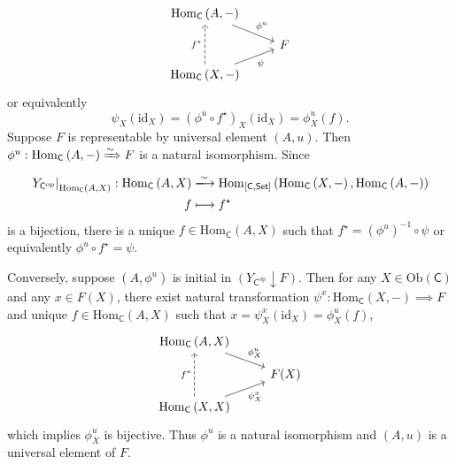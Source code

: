 {\[\begin{tikzcd}[ampersand replacement=\&, row sep=9pt]
               \mathrm{Hom}_{\mathsf{C}}\left(A,-\right) \arrow[rd, "\phi^u"]\&\\
            \& F\\
             \mathrm{Hom}_{\mathsf{C}}\left(X,-\right) \arrow[ru, "\psi"']\arrow[uu, dashed, "f^\star"]\& 
            \end{tikzcd}
    \]
    or equivalently
    \[
        \psi_X(\mathrm{id}_X)=\left(\phi^u\circ f^\star\right)_X(\mathrm{id}_X)=\phi^u_X(f).
    \]
    Suppose $F$ is representable by universal element $(A,u)$. Then $\phi^u:\mathrm{Hom}_\mathsf{C}\left(A,-\right)\xRightarrow{\sim} F$ is a natural isomorphism. Since
    \begin{align*}
        \left.Y_{\mathsf{C}^{\mathrm{op}}}\right|_{\operatorname{Hom}_{\mathsf{C}}\left(A,X\right)}:\operatorname{Hom}_{\mathsf{C}}\left(A,X\right) &\xlongrightarrow{\sim}\operatorname{Hom}_{[\mathsf{C},\mathsf{Set}]}\left(\operatorname{Hom}_{\mathsf{C}}\left(X,-\right), \operatorname{Hom}_{\mathsf{C}}\left(A,-\right)\right) \\
         f & \longmapsto f^\star
    \end{align*}
    is a bijection, there is a unique $f\in \mathrm{Hom}_{\mathsf{C}}(A,X)$ such that $f^\star=\left(\phi^u\right)^{-1}\circ\psi$ or equivalently $\phi^u\circ f^\star=\psi$.

    Conversely, suppose $(A,\phi^u)$ is initial in $\left(  Y_{\mathsf{C}^{\mathrm{op}}}\downarrow F\right)$. Then for any $ X\in \mathrm{Ob}\left(\mathsf{C}\right)$ and any $x\in F(X)$, there exist natural transformation $\psi^x:\mathrm{Hom}_\mathsf{C}\left(X,-\right)\implies F$ and unique $f\in \mathrm{Hom}_{\mathsf{C}}(A,X)$ such that $x=\psi_X^x(\mathrm{id}_X)=\phi^u_X(f)$,
    \[
        \begin{tikzcd}[ampersand replacement=\&, row sep=9pt]
               \mathrm{Hom}_{\mathsf{C}}\left(A,X\right) \arrow[rd, "\phi^u_X"]\&\\
            \& F(X)\\
             \mathrm{Hom}_{\mathsf{C}}\left(X,X\right) \arrow[ru, "\psi_X^x"']\arrow[uu, dashed, "f^*"]\& 
            \end{tikzcd}
    \]
    which implies $\phi^u_X$ is bijective. Thus $\phi^u$ is a natural isomorphism and $(A,u)$ is a universal element of $F$.
}
